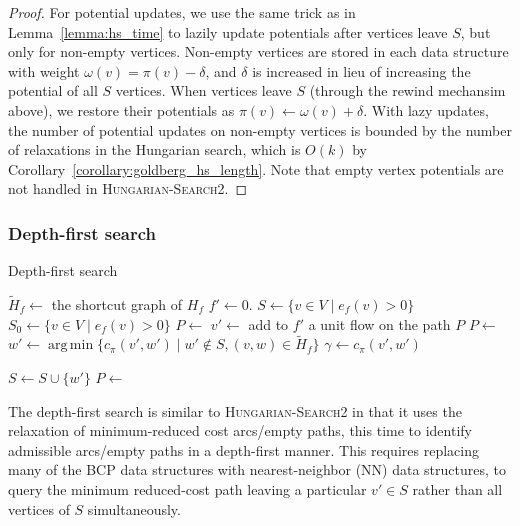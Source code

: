 \documentclass[11pt]{article}
\DeclareMathOperator*{\argmin}{arg\,min}
\theoremstyle{plain}
\numberwithin{figure}{section}
\begin{document}
\begin{proof}
For potential updates, we use the same trick as in Lemma~\ref{lemma:hs_time} to
lazily update potentials after vertices leave $S$, but only for non-empty
vertices.
Non-empty vertices are stored in each data structure with weight
$\omega(v) = \pi(v) - \delta$, and $\delta$ is increased in lieu of increasing
the potential of all $S$ vertices.
When vertices leave $S$ (through the rewind mechansim above), we restore
their potentials as $\pi(v) \gets \omega(v) + \delta$.
With lazy updates, the number of potential updates on non-empty vertices is
bounded by the number of relaxations in the Hungarian search, which is $O(k)$
by Corollary~\ref{corollary:goldberg_hs_length}.
Note that empty vertex potentials are not handled in
\textsc{Hungarian-Search2}.
\end{proof}

\subsubsection{Depth-first search}

\begin{algorithm}
\caption{Depth-first search}
\begin{algorithmic}[1]
	\State $\tilde{H}_f \gets$ the shortcut graph of $H_f$
	\State $f' \gets 0$.
	\State $S \gets \{v \in V \mid e_f(v) > 0\}$
	\State $S_0 \gets \{v \in V \mid e_f(v) > 0\}$
	\State $P \gets$ 
	\Repeat
		\State $v' \gets$ 
			\State add to $f'$ a unit flow on the path $P$
			\State $P \gets$ 
		\Else
			\State $w' \gets \argmin\{c_\pi(v', w') \mid w' \not\in S, (v, w) \in \tilde{H}_f\}$
			\State $\gamma \gets c_\pi(v', w')$

			\Statex %
				\State $S \gets S \cup \{w'\}$
				\State $P \gets$ 
			\Else
				\State {}
			\EndIf
		\EndIf
\EndFunction
\end{algorithmic}
\end{algorithm}

The depth-first search is similar to \textsc{Hungarian-Search2} in that it
uses the relaxation of minimum-reduced cost arcs/empty paths, this time to
identify admissible arcs/empty paths in a depth-first manner.
This requires replacing many of the BCP data structures with nearest-neighbor
(NN) data structures, to query the minimum reduced-cost path leaving a
particular $v' \in S$ rather than all vertices of $S$ simultaneously.
\end{document}
